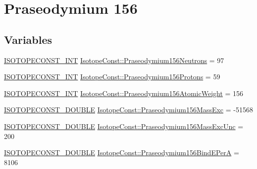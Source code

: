 \hypertarget{group___isotope_const-_praseodymium-_pr156}{}\section{Praseodymium 156}
\label{group___isotope_const-_praseodymium-_pr156}
\subsection*{Variables}
\begin{DoxyCompactItemize}
\item 
\mbox{\hyperlink{group___isotope_const-_macros_ga5f18360b3e99483a35c32d789e62621c}{I\+S\+O\+T\+O\+P\+E\+C\+O\+N\+S\+T\+\_\+\+I\+NT}} \mbox{\hyperlink{group___isotope_const-_praseodymium-_pr156_ga6582f595eca99a91f26ebf752cec5bda}{Isotope\+Const\+::\+Praseodymium156\+Neutrons}} = 97
\item 
\mbox{\hyperlink{group___isotope_const-_macros_ga5f18360b3e99483a35c32d789e62621c}{I\+S\+O\+T\+O\+P\+E\+C\+O\+N\+S\+T\+\_\+\+I\+NT}} \mbox{\hyperlink{group___isotope_const-_praseodymium-_pr156_gafc70dcdd6a9e8635b71c9db45d7d4d27}{Isotope\+Const\+::\+Praseodymium156\+Protons}} = 59
\item 
\mbox{\hyperlink{group___isotope_const-_macros_ga5f18360b3e99483a35c32d789e62621c}{I\+S\+O\+T\+O\+P\+E\+C\+O\+N\+S\+T\+\_\+\+I\+NT}} \mbox{\hyperlink{group___isotope_const-_praseodymium-_pr156_gacf417a08aa96737aa9258921e8fef157}{Isotope\+Const\+::\+Praseodymium156\+Atomic\+Weight}} = 156
\item 
\mbox{\hyperlink{group___isotope_const-_macros_ga8f45a7272ce02c0b4c65c44636ed719a}{I\+S\+O\+T\+O\+P\+E\+C\+O\+N\+S\+T\+\_\+\+D\+O\+U\+B\+LE}} \mbox{\hyperlink{group___isotope_const-_praseodymium-_pr156_ga74c79036d5754ed6e78cc9bdc4b5287a}{Isotope\+Const\+::\+Praseodymium156\+Mass\+Exc}} = -\/51568
\item 
\mbox{\hyperlink{group___isotope_const-_macros_ga8f45a7272ce02c0b4c65c44636ed719a}{I\+S\+O\+T\+O\+P\+E\+C\+O\+N\+S\+T\+\_\+\+D\+O\+U\+B\+LE}} \mbox{\hyperlink{group___isotope_const-_praseodymium-_pr156_gaabd8f76328067e468ed6b67ecce94aab}{Isotope\+Const\+::\+Praseodymium156\+Mass\+Exc\+Unc}} = 200
\item 
\mbox{\hyperlink{group___isotope_const-_macros_ga8f45a7272ce02c0b4c65c44636ed719a}{I\+S\+O\+T\+O\+P\+E\+C\+O\+N\+S\+T\+\_\+\+D\+O\+U\+B\+LE}} \mbox{\hyperlink{group___isotope_const-_praseodymium-_pr156_gacbd6b9a54364245e803279f721dcc197}{Isotope\+Const\+::\+Praseodymium156\+Bind\+E\+PerA}} = 8106

\end{DoxyCompactItemize}
